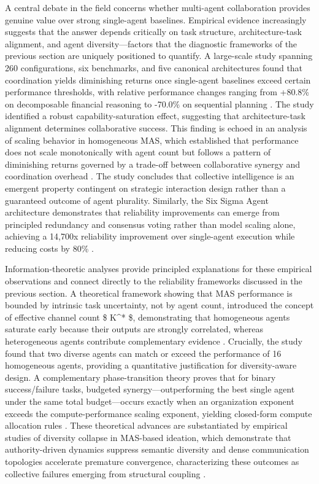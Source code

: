 \documentclass[11pt]{article}
\begin{document}
A central debate in the field concerns whether multi-agent collaboration provides genuine value over strong single-agent baselines. Empirical evidence increasingly suggests that the answer depends critically on task structure, architecture-task alignment, and agent diversity---factors that the diagnostic frameworks of the previous section are uniquely positioned to quantify. A large-scale study spanning 260 configurations, six benchmarks, and five canonical architectures found that coordination yields diminishing returns once single-agent baselines exceed certain performance thresholds, with relative performance changes ranging from +80.8\% on decomposable financial reasoning to -70.0\% on sequential planning \cite{ref111}. The study identified a robust capability-saturation effect, suggesting that architecture-task alignment determines collaborative success. This finding is echoed in an analysis of scaling behavior in homogeneous MAS, which established that performance does not scale monotonically with agent count but follows a pattern of diminishing returns governed by a trade-off between collaborative synergy and coordination overhead \cite{ref28}. The study concludes that collective intelligence is an emergent property contingent on strategic interaction design rather than a guaranteed outcome of agent plurality. Similarly, the Six Sigma Agent architecture demonstrates that reliability improvements can emerge from principled redundancy and consensus voting rather than model scaling alone, achieving a 14,700x reliability improvement over single-agent execution while reducing costs by 80\% \cite{ref357}.

Information-theoretic analyses provide principled explanations for these empirical observations and connect directly to the reliability frameworks discussed in the previous section. A theoretical framework showing that MAS performance is bounded by intrinsic task uncertainty, not by agent count, introduced the concept of effective channel count \$ K\^{}* \$, demonstrating that homogeneous agents saturate early because their outputs are strongly correlated, whereas heterogeneous agents contribute complementary evidence \cite{ref31}. Crucially, the study found that two diverse agents can match or exceed the performance of 16 homogeneous agents, providing a quantitative justification for diversity-aware design. A complementary phase-transition theory proves that for binary success/failure tasks, budgeted synergy---outperforming the best single agent under the same total budget---occurs exactly when an organization exponent exceeds the compute-performance scaling exponent, yielding closed-form compute allocation rules \cite{ref358}. These theoretical advances are substantiated by empirical studies of diversity collapse in MAS-based ideation, which demonstrate that authority-driven dynamics suppress semantic diversity and dense communication topologies accelerate premature convergence, characterizing these outcomes as collective failures emerging from structural coupling \cite{ref359}.
\end{document}
